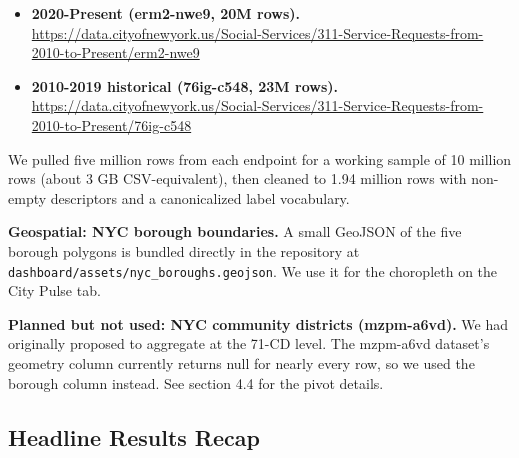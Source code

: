 \documentclass[11pt,letterpaper]{article}
\begin{document}
\begin{itemize}
  \item \textbf{2020-Present (erm2-nwe9, 20M rows).} \\ \url{https://data.cityofnewyork.us/Social-Services/311-Service-Requests-from-2010-to-Present/erm2-nwe9}
  \item \textbf{2010-2019 historical (76ig-c548, 23M rows).} \\ \url{https://data.cityofnewyork.us/Social-Services/311-Service-Requests-from-2010-to-Present/76ig-c548}
\end{itemize}

We pulled five million rows from each endpoint for a working sample of 10 million rows (about 3 GB CSV-equivalent), then cleaned to 1.94 million rows with non-empty descriptors and a canonicalized label vocabulary.

\textbf{Geospatial: NYC borough boundaries.} A small GeoJSON of the five borough polygons is bundled directly in the repository at \texttt{dashboard/assets/nyc\_boroughs.geojson}. We use it for the choropleth on the City Pulse tab.

\textbf{Planned but not used: NYC community districts (mzpm-a6vd).} We had originally proposed to aggregate at the 71-CD level. The mzpm-a6vd dataset's geometry column currently returns null for nearly every row, so we used the borough column instead. See section 4.4 for the pivot details.

\subsection{Headline Results Recap}
\end{document}
